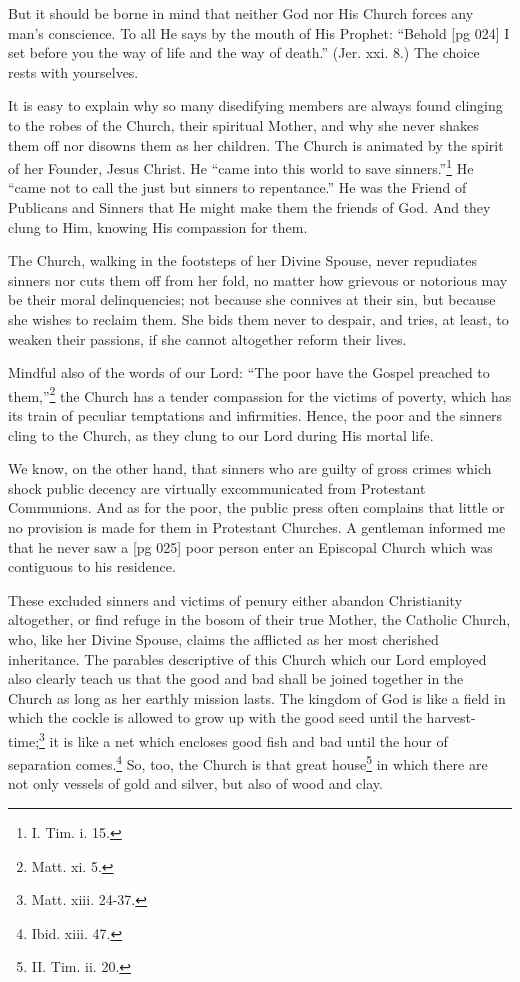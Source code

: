 But it should be borne in mind that neither God
nor His Church forces any man's conscience. To
all He says by the mouth of His Prophet: “Behold
[pg 024]
I set before you the way of life and the way
of death.” (Jer. xxi. 8.) The choice rests with
yourselves.

It is easy to explain why so many disedifying
members are always found clinging to the robes of
the Church, their spiritual Mother, and why she
never shakes them off nor disowns them as her
children. The Church is animated by the spirit of
her Founder, Jesus Christ. He “came into this
world to save sinners.”\footnote{I.
Tim. i. 15.} He “came not to call
the just but sinners to repentance.” He was the
Friend of Publicans and Sinners that He might
make them the friends of God. And they clung to
Him, knowing His compassion for them.

The Church, walking in the footsteps of her
Divine Spouse, never repudiates sinners nor cuts
them off from her fold, no matter how grievous or
notorious may be their moral delinquencies; not
because she connives at their sin, but because she
wishes to reclaim them. She bids them never to
despair, and tries, at least, to weaken their passions,
if she cannot altogether reform their lives.

Mindful also of the words of our Lord: “The
poor have the Gospel preached to them,”\footnote{Matt.
xi. 5.} the Church has a tender compassion for the victims of
poverty, which has its train of peculiar temptations
and infirmities. Hence, the poor and the
sinners cling to the Church, as they clung to our
Lord during His mortal life.

We know, on the other hand, that sinners who
are guilty of gross crimes which shock public
decency are virtually excommunicated from Protestant
Communions. And as for the poor, the
public press often complains that little or no provision
is made for them in Protestant Churches.
A gentleman informed me that he never saw a
[pg 025]
poor person enter an Episcopal Church which was
contiguous to his residence.

These excluded sinners and victims of penury
either abandon Christianity altogether, or find
refuge in the bosom of their true Mother, the
Catholic Church, who, like her Divine Spouse,
claims the afflicted as her most cherished inheritance.
The parables descriptive of this Church
which our Lord employed also clearly teach us
that the good and bad shall be joined together in
the Church as long as her earthly mission lasts.
The kingdom of God is like a field in which the
cockle is allowed to grow up with the good seed
until the harvest-time;\footnote{Matt.
xiii. 24-37.} it is like a net which encloses
good fish and bad until the hour of separation
comes.\footnote{Ibid. xiii.
47.} So, too, the Church is that great
house\footnote{II. Tim. ii.
20.} in which there are not only vessels of gold
and silver, but also of wood and clay.

